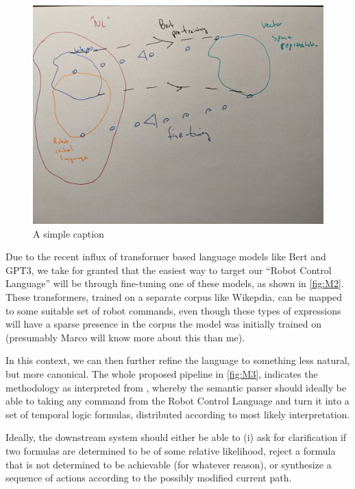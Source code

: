 \documentclass[a4paper, 11pt]{article}
\begin{document}
\begin{figure}
\centering
\includegraphics[width=150mm]{pics/two.jpg}
\caption{A simple caption}\label{fig:M2}
\end{figure}

Due to the recent influx of transformer based language models like Bert and
GPT3, we take for granted that the easiest way to target our ``Robot Control
Language'' will be through fine-tuning one of these models, as shown in
\autoref{fig:M2}. These transformers, trained on a separate corpus like
Wikepdia, can be mapped to some suitable set of robot commands, even though
these types of expressions will have a sparse presence in the corpus the model
was initially trained on (presumably Marco will know more about this than me).

In this context, we can then further refine the language to something less
natural, but more canonical. The whole proposed pipeline in \autoref{fig:M3},
indicates the methodology as interpreted from \cite{fewShotSem}, whereby the
semantic parser should ideally be able to taking any command from the Robot
Control Language and turn it into a set of temporal logic formulas, distributed
according to most likely interpretation.

Ideally, the downstream system should either be able to (i) ask for
clarification if two formulas are determined to be of some relative likelihood,
reject a formula that is not determined to be achievable (for whatever reason),
or synthesize a sequence of actions according to the possibly modified current
path. 
\end{document}
